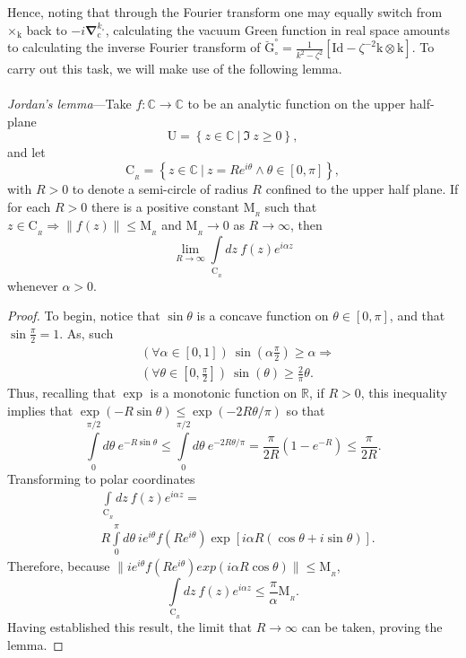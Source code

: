 \documentclass[reprint,aps,prb]{revtex4-2}
\newcommand{\bmm}[1]{\bm{\mathrm{#1}}}
\begin{document}
Hence, noting that through the Fourier transform one may equally switch from $\bm{\times}_{\bmm{k}}$ back to $-i\bm{\nabla}^{k_{\circ}}_{\bmm{c}}$, calculating the vacuum Green function in real space amounts to calculating the inverse Fourier transform of $\breve{\bmm{G}}^{\circ}_{\circ} =\frac{1}{k^{2}- \zeta^{2}}\left[\bmm{Id} - \zeta^{-2} \bmm{k}\otimes\bmm{k}\right]$. 
To carry out this task, we will make use of the following lemma.
\\ \\
\emph{Jordan's lemma}---Take $f:\mathbb{C}\rightarrow\mathbb{C}$ to be an analytic function on the upper half-plane 
$$
\text{U} = \left\{z\in\mathbb{C}~|~\Im~z \geq 0\right\},$$ 
and let 
$$\text{C}_{_{R}} = \left\{z\in \mathbb{C}~|~ z = R e^{i\theta}\land \theta\in\left[0,\pi\right]\right\},$$ with $R >0$ to denote a semi-circle of radius $R$ confined to the upper half plane. 
If for each $R >0$ there is a positive constant $\text{M}_{_{R}}$ such that $z\in\text{C}_{_{R}}\Rightarrow \lVert f\left(z\right)\rVert \leq \text{M}_{_{R}}$ and $\text{M}_{_{R}}\rightarrow 0$ as $R\rightarrow\infty$, then 
$$
	\lim_{R\rightarrow\infty} \int\limits_{\text{C}_{_{R}}}dz~f\left(z\right)e^{i\alpha z}
$$
whenever $\alpha > 0$. 
\begin{proof}
	To begin, notice that $\sin\theta$ is a concave function on $\theta\in\left[0,\pi\right]$, and that $\sin\frac{\pi}{2} =1$. 
	As, such 
	\begin{align}
		&\left(\forall\alpha\in\left[0,1\right]\right)~\sin\left(\alpha\frac{\pi}{2}\right)\geq \alpha  \Rightarrow
		\nonumber \\
		&\left(\forall\theta\in\left[0,\frac{\pi}{2}\right]\right)~ \sin\left(\theta\right)\geq \frac{2}{\pi}\theta.
		\nonumber
	\end{align}
	Thus, recalling that $\exp$ is a monotonic function on $\mathbb{R}$, if $R > 0$, this inequality implies that $\exp\left(-R\sin\theta\right) \leq \exp\left(- 2R \theta /\pi\right)$ so that 
	$$
		\int\limits^{\pi /2}_{0}d\theta~e^{-R\sin\theta} \leq \int\limits^{\pi /2}_{0}d\theta~e^{-2R\theta/\pi} = 
		\frac{\pi}{2R}\left(1-e^{-R}\right)\leq\frac{\pi}{2R}.
	$$
	Transforming to polar coordinates 
	\begin{align}
		&\int\limits_{\text{C}_{_{R}}}dz~f\left(z\right)e^{i\alpha z} = 
		\nonumber \\
		&R\int\limits^{\pi}_{0}d\theta~ ie^{i\theta}f\left(Re^{i\theta}\right)\exp\left[i\alpha R\left(\cos\theta + i\sin\theta\right)\right].
		\nonumber
	\end{align}
	Therefore, because $\lVert i e^{i\theta}f\left(Re^{i\theta}\right) exp\left(i\alpha R\cos\theta\right)\rVert\leq \text{M}_{_{R}}$,
	$$
		\int\limits_{\text{C}_{_{R}}}dz~f\left(z\right)e^{i\alpha z} \leq \frac{\pi}{\alpha}\text{M}_{_{R}}.
	$$	
	Having established this result, the limit that $R\rightarrow\infty$ can be taken, proving the lemma. 
\end{proof}
\end{document}
